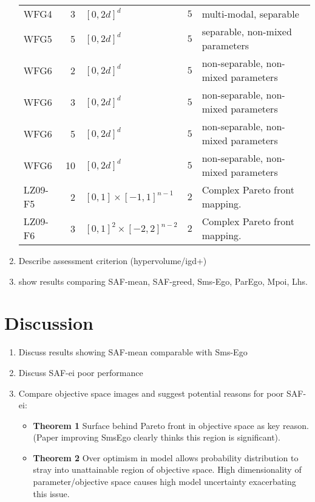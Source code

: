 \documentclass[runningheads]{llncs}
\begin{document}
\begin{enumerate}
\begin{table}
\begin{tabular}{|l|r|l|r|l|}
        WFG4 & 3 & $[0, 2d]^d$ & $5$ & multi-modal, separable\\
        WFG5 & 5 & $[0, 2d]^d$ & $5$ & separable, non-mixed parameters\\
        WFG6 & 2 & $[0, 2d]^d$ & $5$ & non-separable, non-mixed parameters\\
        WFG6 & 3 & $[0, 2d]^d$ & $5$ & non-separable, non-mixed parameters\\
        WFG6 & 5 & $[0, 2d]^d$ & $5$ & non-separable, non-mixed parameters\\
        WFG6 & 10 & $[0, 2d]^d$ & $5$ & non-separable, non-mixed parameters\\
        LZ09-F5 & 2 & $[0,1] \times [-1,1]^{n-1}$ & $2$ & Complex Pareto front mapping. \\
        LZ09-F6 & 3 & $[0,1]^2 \times [-2,2]^{n-2}$ & $2$ &Complex Pareto front mapping.\\
        \hline
        \end{tabular}
        \end{table}

\item Describe assessment criterion (hypervolume/igd+)
\item show results comparing SAF-mean, SAF-greed, Sms-Ego, ParEgo, Mpoi, Lhs.
\end{enumerate}

\section{Discussion}
\begin{enumerate}
    \item Discuss results showing SAF-mean comparable with Sms-Ego
    \item Discuss SAF-ei poor performance
    \item Compare objective space images and suggest potential reasons for poor SAF-ei:
        \begin{itemize}
            \item \textbf{Theorem 1} Surface behind Pareto front in objective space as key reason. (Paper improving SmsEgo clearly thinks this region is significant).  
            \item \textbf{Theorem 2} Over optimism in model allows probability distribution to stray into unattainable region of objective space. High dimensionality of parameter/objective space causes high model uncertainty exacerbating this issue. 
        \end{itemize}
\end{enumerate}
\end{document}
